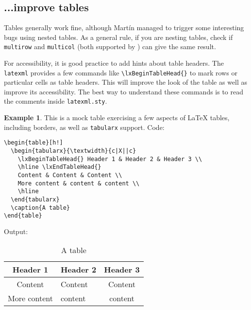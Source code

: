 \documentclass[a4paper]{article}
\def\ltxinline{\lstinline[style=latexml]}
\theoremstyle{definition}
\newtheorem{exa}{Example}[subsection]
\begin{document}
\subsection{...improve tables}
Tables generally work fine, although Mart\'in managed to trigger some interesting bugs using nested tables. As a general rule, if you are nesting tables, check if \verb|multirow| and \verb|multicol| (both supported by \LaTeXML{}) can give the same result.

  For accessibility, it is good practice to add hints about table headers. The \verb|latexml| provides a few commands like \ltxinline|\lxBeginTableHead{}| to mark rows or particular cells as table headers. This will improve the look of the \HTML{} table as well as improve its accessibility. The best way to understand these commands is to read the comments inside \verb|latexml.sty|.

\begin{exa}
  This is a mock table exercising a few aspects of \LaTeX{} tables, including borders, as well as \verb|tabularx| support.
  Code:
  \begin{lstlisting}[style=latexml]
\begin{table}[h!]
  \begin{tabularx}{\textwidth}{c|X||c}
    \lxBeginTableHead{} Header 1 & Header 2 & Header 3 \\
    \hline \lxEndTableHead{}
    Content & Content & Content \\
    More content & content & content \\
    \hline
  \end{tabularx}
  \caption{A table}
\end{table}
  \end{lstlisting}
  Output:
  \begin{table}[h!]
    \begin{tabularx}{\textwidth}{c|X||c}
      \lxBeginTableHead{} Header 1 & Header 2 & Header 3 \\
      \hline \lxEndTableHead{}
      Content & Content & Content \\
      More content & content & content \\
      \hline
    \end{tabularx}
    \caption{A table}
  \end{table}
\end{exa}
\end{document}
